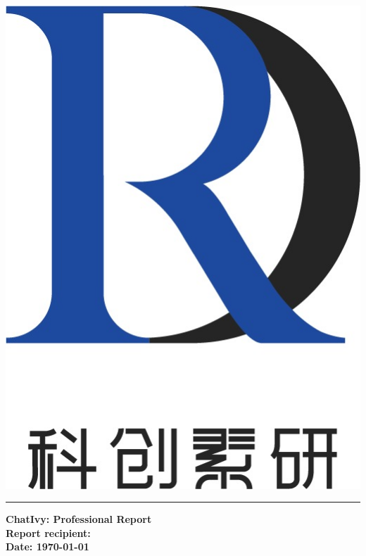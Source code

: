 \documentclass[12pt]{article}
\newcommand{\insertname}{
}
\begin{document}
\thispagestyle{empty}
\begin{CJK*}{UTF8}{gbsn}

\noindent\hfill\begin{minipage}{2.0cm} %
   \includegraphics[width=\textwidth]{logo.jpg}\\
\end{minipage}
\vspace{-3.7cm}

\noindent\textcolor{darkblue}{\rule{\textwidth}{5pt}} %
\vspace{20pt} %

{\noindent\Large\bfseries\hspace*{0.5cm}ChatIvy:  Professional Report}\\[12pt] %
{\noindent\large\bfseries\hspace*{0.5cm}Report recipient: \insertname}\\[10pt] %
{\noindent\large\bfseries\hspace*{0.5cm}Date: \today}
\vspace{10pt}


\end{CJK*}
\end{document}
